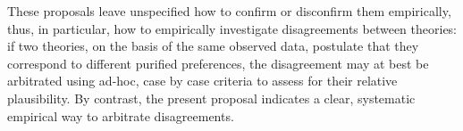\documentclass[version=last, pagesize, twoside=off, bibliography=totoc, DIV=calc, fontsize=12pt, a4paper, french, english]{scrartcl}
\begin{document}
These proposals leave unspecified how to confirm or disconfirm them empirically, thus, in particular, how to empirically investigate disagreements between theories: if two theories, on the basis of the same observed data, postulate that they correspond to different purified preferences, the disagreement may at best be arbitrated using ad-hoc, case by case criteria to assess for their relative plausibility. By contrast, the present proposal indicates a clear, systematic empirical way to arbitrate disagreements.
\end{document}
